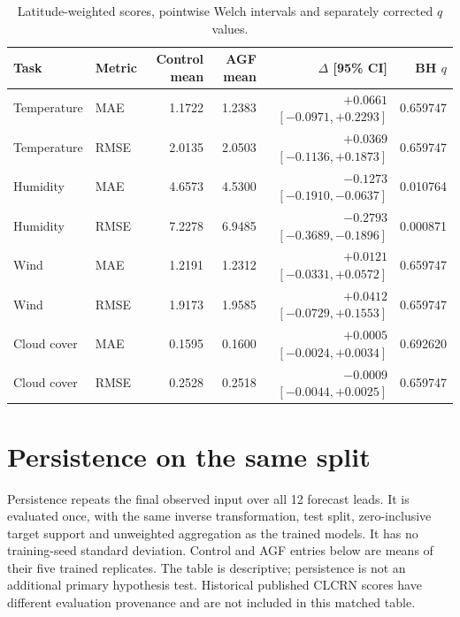 \documentclass[10pt,a4paper]{article}
\begin{document}
\begin{table}[H]\centering\small\setlength{\tabcolsep}{5pt}\setlength{\parskip}{0pt}

\caption{Latitude-weighted scores, pointwise Welch intervals and separately corrected $q$ values.}\label{tab:weighted}

\begin{tabular}{llrrrr}

\toprule
Task & Metric & Control mean & AGF mean & $\Delta$ [95\% CI] & BH $q$ \\
\midrule

Temperature & MAE & 1.1722 & 1.2383 & $+0.0661$ $[-0.0971, +0.2293]$ & 0.659747 \\

Temperature & RMSE & 2.0135 & 2.0503 & $+0.0369$ $[-0.1136, +0.1873]$ & 0.659747 \\

Humidity & MAE & 4.6573 & 4.5300 & $-0.1273$ $[-0.1910, -0.0637]$ & 0.010764 \\

Humidity & RMSE & 7.2278 & 6.9485 & $-0.2793$ $[-0.3689, -0.1896]$ & 0.000871 \\

Wind & MAE & 1.2191 & 1.2312 & $+0.0121$ $[-0.0331, +0.0572]$ & 0.659747 \\

Wind & RMSE & 1.9173 & 1.9585 & $+0.0412$ $[-0.0729, +0.1553]$ & 0.659747 \\

Cloud cover & MAE & 0.1595 & 0.1600 & $+0.0005$ $[-0.0024, +0.0034]$ & 0.692620 \\

Cloud cover & RMSE & 0.2528 & 0.2518 & $-0.0009$ $[-0.0044, +0.0025]$ & 0.659747 \\

\bottomrule\end{tabular}\end{table}

\section{Persistence on the same split}
Persistence repeats the final observed input over all 12 forecast leads. It is evaluated once, with the same inverse transformation, test split, zero-inclusive target support and unweighted aggregation as the trained models. It has no training-seed standard deviation. Control and AGF entries below are means of their five trained replicates. The table is descriptive; persistence is not an additional primary hypothesis test. Historical published CLCRN scores have different evaluation provenance and are not included in this matched table.
\end{document}
